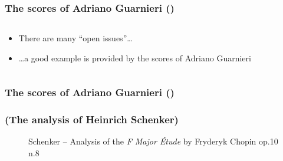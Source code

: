 \setcounter{ms}{0}
\begin{frame}
    \frametitle<+- | alert@+->{The scores of Adriano Guarnieri ()}

    \begin{columns}[T]
        \begin{column}{0.7\textwidth}
				    \begin{itemize}[<+- | alert@+->]
				       \item There are many ``open issues''\dots
				       \item \dots a good example is provided by the scores of Adriano
											 Guarnieri
				    \end{itemize}
        \end{column}
        \begin{column}{0.3\textwidth}
        \end{column}
    \end{columns}
    
\end{frame}

\begin{frame}
    \frametitle{The scores of Adriano Guarnieri ()}

		\vspace{-0.4cm}
		\begin{figure}[H!]
       \href{run:\imagedir/Guarnieri-Passione-Lettera_M.jpg}
             {}
			 \caption{}
		\end{figure}

\end{frame}

\begin{frame}
    \frametitle{(The analysis of Heinrich Schenker)}

    \begin{center}
        \begin{figure}
            \caption{Schenker -- Analysis of the \emph{F Major Étude} by Fryderyk Chopin op.10 n.8}
        \end{figure}
    \end{center}

\end{frame}
